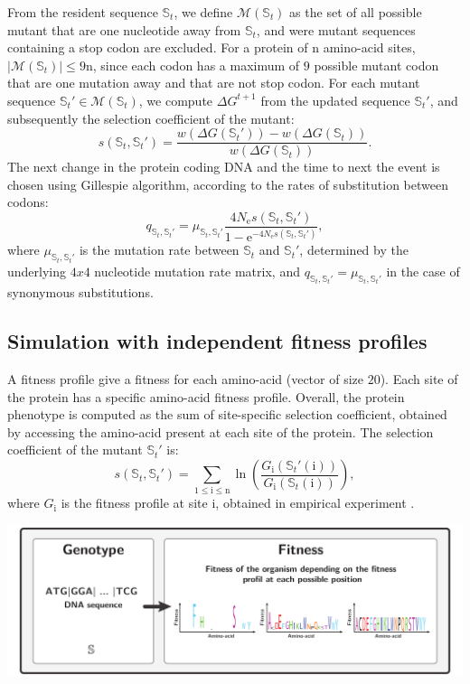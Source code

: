 \documentclass{article}
\newcommand{\e}{\mathrm{e}}
\newcommand{\Ne}{N_{\mathrm{e}}}
\newcommand{\Nsite}{\text{n}}
\newcommand{\site}{\text{i}}
\newcommand{\ci}{\mathbb{S}_{t}}
\newcommand{\cj}{\mathbb{S}_{t}'}
\newcommand{\itoj}{\ci, \cj}
\newcommand{\setNeighbors}{\mathcal{M}\left(\ci\right)}
\newcommand{\submatrix}{q}
\newcommand{\phenoFold}{\Delta G}
\begin{document}
From the resident sequence $\ci$, we define $\setNeighbors$ as the set of all possible mutant that are one nucleotide away from $\ci$, and were mutant sequences containing a stop codon are excluded.
For a protein of $\Nsite$ amino-acid sites, $\left| \setNeighbors \right| \leq 9 \Nsite$, since each codon has a maximum of $9$ possible mutant codon that are one mutation away and that are not stop codon.
For each mutant sequence $\cj \in \setNeighbors$, we compute $\phenoFold^{t+1}$ from the updated sequence $\cj$, and subsequently the selection coefficient of the mutant:
\begin{equation}
s \left( \ci,\cj\right) = \dfrac{ w\left( \phenoFold\left(\cj\right) \right) - w\left( \phenoFold\left(\ci\right) \right)}{w\left( \phenoFold\left(\ci\right) \right)}.
\end{equation}
The next change in the protein coding DNA and the time to next the event is chosen using Gillespie algorithm, according to the rates of substitution between codons:
\begin{equation}
\submatrix_{\itoj} = \mu_{\itoj} \dfrac{4 \Ne s \left( \ci,\cj\right)}{1 - \e^{-4 \Ne s \left( \ci,\cj\right)}}, 
\end{equation}
where $\mu_{\itoj}$ is the mutation rate between $\ci$ and $\cj$, determined by the underlying $4x4$ nucleotide mutation rate matrix, and ${\submatrix_{\itoj}} = \mu_{\itoj}$ in the case of synonymous substitutions.


\subsection{Simulation with independent fitness profiles}
A fitness profile give a fitness for each amino-acid (vector of size $20$).
Each site of the protein has a specific amino-acid fitness profile.
Overall, the protein phenotype is computed as the sum of site-specific selection coefficient, obtained by accessing the amino-acid present at each site of the protein.
The selection coefficient of the mutant $\cj$ is:
\begin{equation}
s \left( \ci,\cj\right) = \sum_{1 \leq \site \leq \Nsite} \ln \left( \dfrac{G_{\site} \left(\cj(\site) \right)}{G_{\site} \left(\ci(\site) \right)} \right) ,
\end{equation}
where $G_{\site}$ is the fitness profile at site $\site$, obtained in empirical experiment \cite{Bloom2017}.
\begin{center}
	\includegraphics[width=165mm] {artworks/ModelSimuDiv.pdf}
\end{center}
\end{document}

